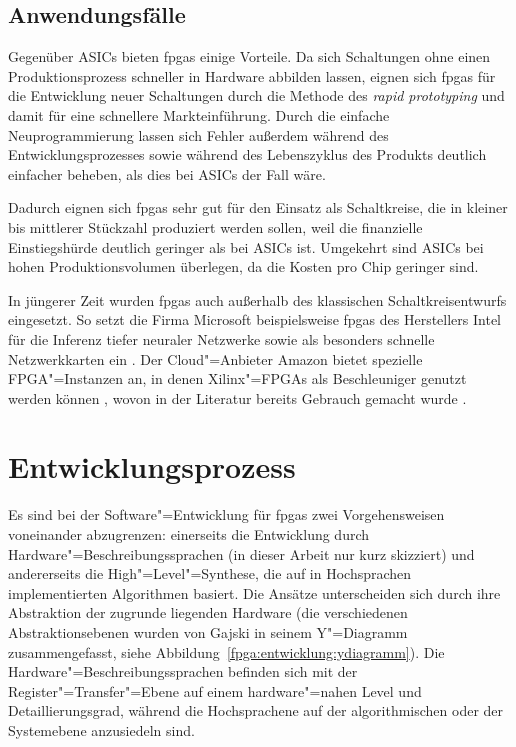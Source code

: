 \subsection{Anwendungsfälle}\label{fpga:ueberblick:anwendungen}

Gegenüber ASICs bieten \gls{fpga}s einige Vorteile. Da sich Schaltungen ohne
einen Produktionsprozess schneller in Hardware abbilden lassen, eignen sich
\gls{fpga}s für die Entwicklung neuer Schaltungen durch die Methode des
\textit{rapid prototyping} und damit für eine schnellere Markteinführung. Durch
die einfache Neuprogrammierung lassen sich Fehler außerdem während des
Entwicklungsprozesses sowie während des Lebenszyklus des Produkts deutlich
einfacher beheben, als dies bei ASICs der Fall wäre.
\cite[vgl.][10-1]{hawkins2010}

Dadurch eignen sich \gls{fpga}s sehr gut für den Einsatz als Schaltkreise, die
in kleiner bis mittlerer Stückzahl produziert werden sollen, weil die
finanzielle Einstiegshürde deutlich geringer als bei ASICs ist. Umgekehrt sind
ASICs bei hohen Produktionsvolumen überlegen, da die Kosten pro Chip geringer
sind.
\cite[vgl.][10-2]{hawkins2010}

In jüngerer Zeit wurden \gls{fpga}s auch außerhalb des klassischen
Schaltkreisentwurfs eingesetzt. So setzt die Firma Microsoft beispielsweise
\gls{fpga}s des Herstellers Intel für die Inferenz tiefer neuraler Netzwerke
\cite[vgl.][]{fowers2018, chung2018} sowie als besonders schnelle
Netzwerkkarten ein \cite[vgl.][]{firestone2018}. Der Cloud"=Anbieter Amazon
bietet spezielle FPGA"=Instanzen an, in denen Xilinx"=FPGAs als Beschleuniger
genutzt werden können \cite[vgl.][]{amazonec2f1}, wovon in der Literatur bereits
Gebrauch gemacht wurde \cite[vgl. etwa][]{ditucci2017}.

\section{Entwicklungsprozess}\label{fpga:entwicklung}

Es sind bei der Software"=Entwicklung für \gls{fpga}s zwei Vorgehensweisen
voneinander abzugrenzen: einerseits die Entwicklung durch
Hardware"=Beschreibungssprachen (in dieser Arbeit nur kurz skizziert) und
andererseits die High"=Level"=Synthese, die auf in Hochsprachen implementierten
Algorithmen basiert. Die Ansätze unterscheiden sich durch ihre Abstraktion der
zugrunde liegenden Hardware (die verschiedenen Abstraktionsebenen wurden von
Gajski in seinem Y"=Diagramm zusammengefasst, siehe
Abbildung~\ref{fpga:entwicklung:ydiagramm}). Die Hardware"=Beschreibungssprachen
befinden sich mit der Register"=Transfer"=Ebene auf einem hardware"=nahen Level
und Detaillierungsgrad, während die Hochsprachene auf der algorithmischen
oder der Systemebene anzusiedeln sind. \cite[vgl.][10--11]{kesel2013}

